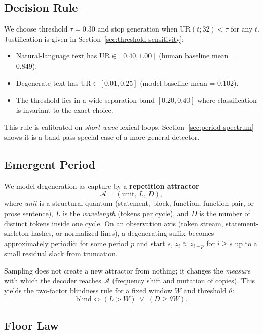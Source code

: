 \documentclass[11pt]{article}
\begin{document}
\subsection{Decision Rule}

We choose threshold $\tau = 0.30$ and stop generation when $\text{UR}(t; 32) < \tau$ for any $t$. Justification is given in Section~\ref{sec:threshold-sensitivity}:
\begin{itemize}
    \item Natural-language text has $\text{UR} \in [0.40, 1.00]$ (human baseline mean = 0.849).
    \item Degenerate text has $\text{UR} \in [0.01, 0.25]$ (model baseline mean = 0.102).
    \item The threshold lies in a wide separation band $[0.20, 0.40]$ where classification is invariant to the exact choice.
\end{itemize}
This rule is calibrated on \emph{short-wave} lexical loops. Section~\ref{sec:period-spectrum} shows it is a band-pass special case of a more general detector.

\subsection{Emergent Period}
\label{sec:method-period}

We model degeneration as capture by a \textbf{repetition attractor}
\[
\mathcal{A} = (\text{unit},\, L,\, D),
\]
where \emph{unit} is a structural quantum (statement, block, function, function pair, or prose sentence), $L$ is the \emph{wavelength} (tokens per cycle), and $D$ is the number of distinct tokens inside one cycle. On an observation axis (token stream, statement-skeleton hashes, or normalized lines), a degenerating suffix becomes approximately periodic: for some period $p$ and start $s$, $z_{i} \approx z_{i-p}$ for $i \ge s$ up to a small residual slack from truncation.

Sampling does not create a new attractor from nothing; it changes the \emph{measure} with which the decoder reaches $\mathcal{A}$ (frequency shift and mutation of copies). This yields the two-factor blindness rule for a fixed window $W$ and threshold $\theta$:
\[
\text{blind} \iff (L > W) \;\lor\; (D \ge \theta W).
\]

\subsection{Floor Law}
\label{sec:method-floor}
\end{document}

